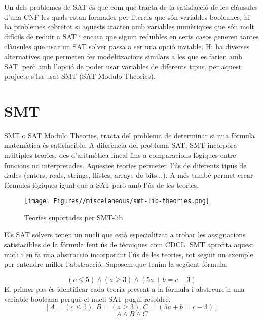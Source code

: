 Un dels problemes de SAT és que com que tracta de la satisfacció de les clàusules d'una CNF les quals estan formades per literals que són variables booleanes, hi ha problemes sobretot si aquests tracten amb variables numèriques que són molt difícils de reduir a SAT i encara que siguin reduïbles en certs casos generen tantes clàusules que usar un SAT solver passa a ser una opció inviable. Hi ha diverses alternatives que permeten fer modelitzacions similars a les que es farien amb SAT, però amb l'opció de poder usar variables de diferents tipus, per aquest projecte s'ha usat SMT (SAT Modulo Theories).

\section{SMT}
SMT o SAT Modulo Theories, tracta del problema de determinar si una fórmula matemàtica és satisfacible. A diferència del problema SAT, SMT incorpora múltiples teories, des d'aritmètica lineal fins a comparacions lògiques entre funcions no interpretades. Aquestes teories permeten l'ús de diferents tipus de dades (enters, reals, strings, llistes, arrays de bits...). A més també permet crear fórmules lògiques igual que a SAT però amb l'ús de les teories.\\
\begin{figure}
    \centering
    \texttt{[image: Figures//miscelaneous/smt-lib-theories.png]}
    \caption{Teories suportades per SMT-lib \cite{SMT-solving}}
    \label{fig:smt-theories}
\end{figure}

Els SAT solvers tenen un nucli que està especialitzat a trobar les assignacions satisfacibles de la fórmula fent ús de tècniques com CDCL. SMT aprofita aquest nucli i en fa una abstracció incorporant l'ús de les teories, tot seguit un exemple per entendre millor l'abstracció.
Suposem que tenim la següent fórmula:

$$ (c \le 5) \land (a \geq 3) \land (5a+b=c-3) $$
El primer pas és identificar cada teoria present a la fórmula i abstreure'n una variable booleana perquè el nucli SAT pugui resoldre.\\
$$ [A=(c \le 5), B=(a \geq 3), C=(5a+b=c-3)] $$
$$ A \land B \land C $$

